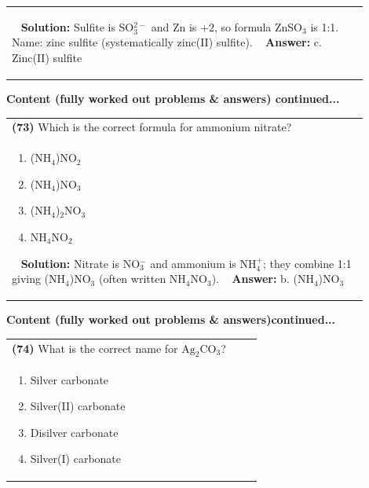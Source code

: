 \documentclass{article}
\begin{document}
{\begin{tabular}{|p{0.9\linewidth}|}
\begin{minipage}[t]{0.85\linewidth}
\begin{enumerate}[label=\alph*.]
\end{enumerate}
\end{minipage}\
\hline
\vspace{0.2cm}
\textbf{Solution:} Sulfite is SO$_3^{2-}$ and Zn is $+2$, so formula ZnSO$_3$ is 1:1. Name: zinc sulfite (systematically zinc(II) sulfite). \
\hline
\vspace{0.2cm}
\textbf{Answer:} c. Zinc(II) sulfite \
\hline
\end{tabular}
\newpage
\noindent
{\large\textbf{Content (fully worked out problems & answers) continued...}}\\[0.2em]
\begin{tabular}{|p{0.9\linewidth}|}
\hline
\vspace{0.2cm}
\textbf{(73)} Which is the correct formula for ammonium nitrate? \\
\begin{minipage}[t]{0.85\linewidth}
\begin{enumerate}[label=\alph*.]
\item (NH$_4$)NO$_2$ \
\item (NH$_4$)NO$_3$ \
\item (NH$_4$)$_2$NO$_3$ \
\item NH$_4$NO$_2$
\end{enumerate}
\end{minipage}\
\hline
\vspace{0.2cm}
\textbf{Solution:} Nitrate is NO$_3^-$ and ammonium is NH$_4^+$; they combine 1:1 giving (NH$_4$)NO$_3$ (often written NH$_4$NO$_3$). \
\hline
\vspace{0.2cm}
\textbf{Answer:} b. (NH$_4$)NO$_3$ \
\hline
\end{tabular}
\newpage
\noindent
{\large\textbf{Content (fully worked out problems & answers)continued...}}\\[0.2em]
\begin{tabular}{|p{0.9\linewidth}|}
\hline
\vspace{0.2cm}
\textbf{(74)} What is the correct name for $\text{Ag}_2\text{CO}_3$? \\
\begin{minipage}[t]{0.85\linewidth}
\begin{enumerate}[label=\alph*.]
\item Silver carbonate \
\item Silver(II) carbonate \
\item Disilver carbonate \
\item Silver(I) carbonate
\end{enumerate}

\end{minipage}
\end{tabular}}
\end{document}
